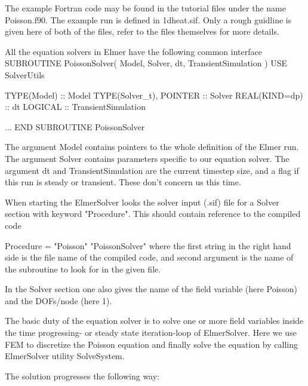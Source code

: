 The example Fortran code may be found in the tutorial files under the
name Poisson.f90.  The example run is defined in 1dheat.sif.
Only a rough guidline is given here of both of the files, refer to the
files themselves for more details.

All the  equation solvers in Elmer have the following common interface
\ttbegin
SUBROUTINE PoissonSolver( Model, Solver, dt, TransientSimulation )
  USE SolverUtils

  TYPE(Model) :: Model
  TYPE(Solver_t), POINTER :: Solver
  REAL(KIND=dp) :: dt
  LOGICAL :: TransientSimulation

    ...
END SUBROUTINE PoissonSolver
\ttend

The argument Model contains pointers to the whole definition of the Elmer run.
The argument Solver contains parameters specific to our equation solver.
The argument dt and TransientSimulation are the current timestep size, and a
flag if this run is steady or transient. These don't concern us this time.

When starting the ElmerSolver looks the solver input (.sif) file for a
Solver section with keyword "Procedure". This should contain reference to
the compiled code

\ttbegin
   Procedure = "Poisson" "PoissonSolver"
\ttend
where the first string in the right hand side is the file name of the compiled
code, and second argument is the name of the subroutine to look for in the given file.

In the Solver section one also gives the name of the field variable
(here Poisson) and the DOFs/node (here 1).

The basic duty of the equation solver is to solve one or more field variables inside
the time progressing- or steady state iteration-loop of ElmerSolver.  Here we use
FEM to discretize the Poisson equation and finally solve the equation by calling
ElmerSolver utility SolveSystem.

The solution progresses the following way:

